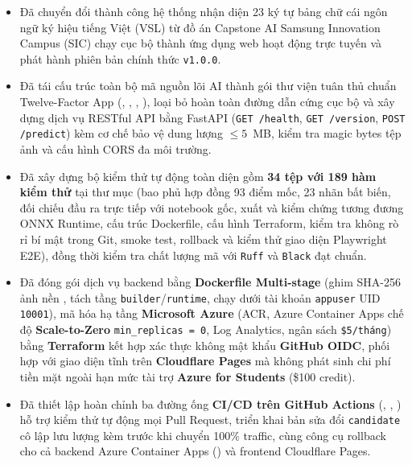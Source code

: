 \begin{itemize}
    \item Đã chuyển đổi thành công hệ thống nhận diện 23 ký tự bảng chữ cái ngôn ngữ ký hiệu tiếng Việt (VSL) từ đồ án Capstone AI Samsung Innovation Campus (SIC) chạy cục bộ thành ứng dụng web hoạt động trực tuyến và phát hành phiên bản chính thức \texttt{v1.0.0}.
    \item Đã tái cấu trúc toàn bộ mã nguồn lõi AI thành gói thư viện  tuân thủ chuẩn Twelve-Factor App (, , , ), loại bỏ hoàn toàn đường dẫn cứng cục bộ và xây dựng dịch vụ RESTful API bằng FastAPI (\texttt{GET /health}, \texttt{GET /version}, \texttt{POST /predict}) kèm cơ chế bảo vệ dung lượng \mbox{$\le 5$ MB}, kiểm tra magic bytes tệp ảnh và cấu hình CORS đa môi trường.
    \item Đã xây dựng bộ kiểm thử tự động toàn diện gồm \textbf{34 tệp với 189 hàm kiểm thử} tại thư mục  (bao phủ hợp đồng 93 điểm mốc, 23 nhãn bất biến, đối chiếu đầu ra trực tiếp với notebook gốc, xuất và kiểm chứng tương đương ONNX Runtime, cấu trúc Dockerfile, cấu hình Terraform, kiểm tra không rò rỉ bí mật trong Git, smoke test, rollback và kiểm thử giao diện Playwright E2E), đồng thời kiểm tra chất lượng mã với \texttt{Ruff} và \texttt{Black} đạt chuẩn.
    \item Đã đóng gói dịch vụ backend bằng \textbf{Dockerfile Multi-stage} (ghim SHA-256 ảnh nền , tách tầng \texttt{builder}/\texttt{runtime}, chạy dưới tài khoản \texttt{appuser} UID \texttt{10001}), mã hóa hạ tầng \textbf{Microsoft Azure} (ACR, Azure Container Apps chế độ \textbf{Scale-to-Zero} \texttt{min\_replicas = 0}, Log Analytics, ngân sách \texttt{\$5/tháng}) bằng \textbf{Terraform} kết hợp xác thực không mật khẩu \textbf{GitHub OIDC}, phối hợp với giao diện tĩnh trên \textbf{Cloudflare Pages} mà không phát sinh chi phí tiền mặt ngoài hạn mức tài trợ \textbf{Azure for Students} (\$100 credit).
    \item Đã thiết lập hoàn chỉnh ba đường ống \textbf{CI/CD trên GitHub Actions} (, , ) hỗ trợ kiểm thử tự động mọi Pull Request, triển khai bản sửa đổi \texttt{candidate} cô lập lưu lượng kèm  trước khi chuyển 100\% traffic, cùng công cụ rollback cho cả backend Azure Container Apps () và frontend Cloudflare Pages.
\end{itemize}

